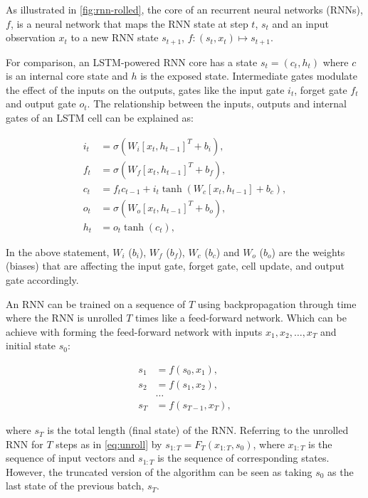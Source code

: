As illustrated in \ref{fig:rnn-rolled}, the core of an recurrent neural networks (RNNs), $f$, is a neural network that maps the RNN state at step $t$, $s_t$ and an input observation $x_t$ to a new RNN state $s_{t+1}$, $f: (s_t, x_t) \mapsto s_{t+1}$.

For comparison, an LSTM-powered RNN core \cite{Hochreiter1997} has a state $s_t = (c_t, h_t)$ where $c$ is an internal core state and $h$ is the exposed state. Intermediate gates modulate the effect of the inputs on the outputs, gates like the input gate $i_t$, forget gate $f_t$ and output gate $o_t$. The relationship between the inputs, outputs and internal gates of an LSTM cell can be explained as:

\begin{align*}
i_t &= \sigma(W_i [x_t, h_{t-1}]^T + b_i), \\
f_t &= \sigma(W_f [x_t, h_{t-1}]^T + b_f), \\
c_t &= f_t c_{t-1} + i_t \tanh(W_c [x_t, h_{t-1}] + b_c), \\
o_t &= \sigma(W_o [x_t, h_{t-1}]^T + b_o), \\
h_t &= o_t \tanh(c_t),
\end{align*}

In the above statement, $W_i$ ($b_i$), $W_f$ ($b_f$), $W_c$ ($b_c$) and $W_o$ ($b_o$) are the weights (biases) that are affecting the input gate, forget gate, cell update, and output gate accordingly.

An RNN can be trained on a sequence of $T$ using backpropagation through time where the RNN is unrolled $T$ times like a feed-forward network.
Which can be achieve with forming the feed-forward network with inputs
$x_1, x_2, \dots, x_T$ and initial state $s_0$:

\begin{align}
s_1 &= f(s_0, x_1), \nonumber \\
s_2 &= f(s_1, x_2), \nonumber \\
&\dots \nonumber \\
\label{eq:unroll}
s_T &= f(s_{T-1}, x_T), 
\end{align}

where $s_T$ is the total length (final state) of the RNN.
Referring to the unrolled RNN for $T$ steps as in \eqref{eq:unroll} by $s_{1:T} = F_T(x_{1:T}, s_0)$,
where $x_{1:T}$ is the sequence of input vectors and $s_{1:T}$ is the sequence of corresponding states. However, the truncated version of the algorithm can be seen as taking $s_0$ as the last state of the previous batch, $s_T$.


